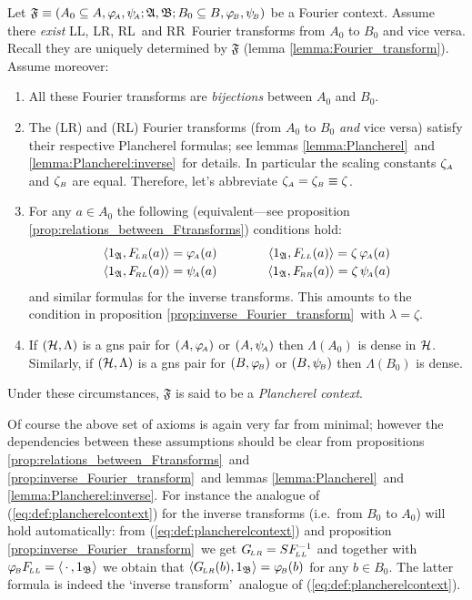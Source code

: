 \begin{defn_sec}  \label{def:Plancherel_context}
Let $\mathfrak{F}\equiv (A_0 \subseteq A, \varphi_{\!\scriptscriptstyle A}, \psi_{\!\scriptscriptstyle A}; \mathfrak A, \mathfrak B; B_0 \subseteq B, \varphi_{\scriptscriptstyle \! B}, \psi_{\scriptscriptstyle \! B} )$ be a Fourier context. Assume there {\em exist\/}
{\scriptsize LL}, {\scriptsize LR}, {\scriptsize RL}\ and {\scriptsize RR}\
Fourier transforms from $A_0$ to $B_0$ and vice versa.
Recall they are uniquely determined by $\mathfrak{F}$
(lemma \ref{lemma:Fourier_transform}). Assume moreover:
\begin{enumerate}
\item
All these Fourier transforms are {\em bijections\/} between $A_0$ and $B_0$.
\item
The ({\scriptsize LR}) and ({\scriptsize RL}) Fourier transforms (from $A_0$ to $B_0$ {\em and\/}
vice versa) satisfy their respective Plancherel formulas;
see lemmas \ref{lemma:Plancherel}\ and \ref{lemma:Plancherel:inverse}\ for details.
In particular the scaling constants $\zeta_{\scriptscriptstyle A}$ and $\zeta_{\scriptscriptstyle B}$ are equal.
Therefore, let's abbreviate $\zeta_{\scriptscriptstyle A}=\zeta_{\scriptscriptstyle B}\equiv\zeta$.
\item For any $a\in A_0$ the following
(equivalent---see proposition \ref{prop:relations_between_Ftransforms})
conditions hold:
\begin{equation}\label{eq:def:plancherelcontext}
\begin{array}{ccc}
   \pair{1_{\frakA}}{\FLR(a)} = \phiA(a) & \hspace{2em}&
   \pair{1_{\frakA}}{\FLL(a)} = \zeta \,\phiA(a)
\\ \vertL
   \pair{1_{\frakA}}{\FRL(a)} = \psiA(a)  &   &
   \pair{1_{\frakA}}{\FRR(a)} = \zeta \,\psiA(a)
\end{array}
\end{equation}
and similar formulas for the inverse transforms. This amounts to the condition in
proposition \ref{prop:inverse_Fourier_transform}\ with $\lambda=\zeta$.
\item
If $(\mathcal H,\Lambda)$ is a {\sc gns} pair for $(A,\varphi_{\!\scriptscriptstyle A})$ or $(A,\psi_{\!\scriptscriptstyle A})$
then $\Lambda(A_0)$ is dense in $\mathcal H$.
Similarly, if $(\mathcal H,\Lambda)$ is a {\sc gns} pair for $(B,\varphi_{\scriptscriptstyle \! B})$
or $(B,\psi_{\scriptscriptstyle \! B})$ then $\Lambda(B_0)$ is dense.
\end{enumerate}
Under these circumstances, $\mathfrak{F}$ is said to be a {\em Plancherel context}.
\end{defn_sec}

Of course the above set of axioms is again very far from minimal;
however the dependencies between these assumptions should be clear from
propositions
\ref{prop:relations_between_Ftransforms}\ and
\ref{prop:inverse_Fourier_transform}\
and lemmas
\ref{lemma:Plancherel}\ and \ref{lemma:Plancherel:inverse}\@.
For instance the analogue of (\ref{eq:def:plancherelcontext}) for
the inverse transforms (i.e.\ from $B_0$ to $A_0$) will hold
automatically: from  (\ref{eq:def:plancherelcontext}) and
proposition \ref{prop:inverse_Fourier_transform}\ we get
$G_{\!\scriptscriptstyle LR} = S F_{\!\scriptscriptstyle LL}^{-1}$ and together with
$\varphi_{\scriptscriptstyle \! B} F_{\!\scriptscriptstyle LL} = \langle \,\cdot\,,1_{\mathfrak B} \rangle$
we obtain that $\langle G_{\!\scriptscriptstyle LR}(b),1_{\mathfrak B} \rangle = \varphi_{\scriptscriptstyle \! B}(b)$ for any $b\in B_0$.
The latter formula is indeed the \lq inverse transform\rq\
analogue of (\ref{eq:def:plancherelcontext}).



